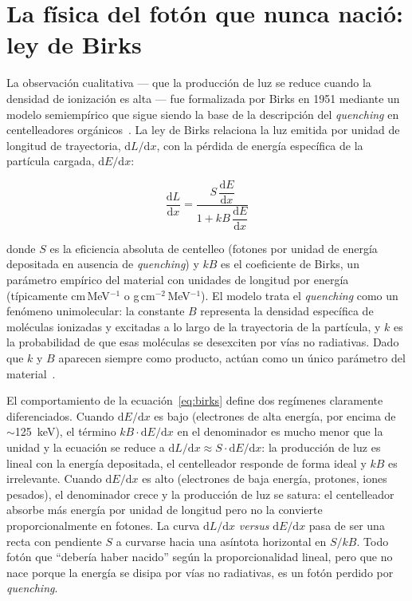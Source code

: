 \documentclass[11pt,a4paper]{article}
\begin{document}
\section{La física del fotón que nunca nació: ley de Birks}



La observación cualitativa --- que la producción de luz se reduce cuando la densidad de ionización es alta --- fue formalizada por Birks en 1951 mediante un modelo semiempírico que sigue siendo la base de la descripción del \textit{quenching} en centelleadores orgánicos~\cite{birks1951}. La ley de Birks relaciona la luz emitida por unidad de longitud de trayectoria, $\mathrm{d}L/\mathrm{d}x$, con la pérdida de energía específica de la partícula cargada, $\mathrm{d}E/\mathrm{d}x$:

\begin{equation}
\frac{\mathrm{d}L}{\mathrm{d}x} = \frac{S \,\dfrac{\mathrm{d}E}{\mathrm{d}x}}{1 + kB \,\dfrac{\mathrm{d}E}{\mathrm{d}x}}
\label{eq:birks}
\end{equation}

\noindent donde $S$ es la eficiencia absoluta de centelleo (fotones por unidad de energía depositada en ausencia de \textit{quenching}) y $kB$ es el coeficiente de Birks, un parámetro empírico del material con unidades de longitud por energía (típicamente cm\,MeV$^{-1}$ o g\,cm$^{-2}$\,MeV$^{-1}$). El modelo trata el \textit{quenching} como un fenómeno unimolecular: la constante $B$ representa la densidad específica de moléculas ionizadas y excitadas a lo largo de la trayectoria de la partícula, y $k$ es la probabilidad de que esas moléculas se desexciten por vías no radiativas. Dado que $k$ y $B$ aparecen siempre como producto, actúan como un único parámetro del material~\cite{boivin2016}.

El comportamiento de la ecuación~\eqref{eq:birks} define dos regímenes claramente diferenciados. Cuando $\mathrm{d}E/\mathrm{d}x$ es bajo (electrones de alta energía, por encima de $\sim$125~keV), el término $kB \cdot \mathrm{d}E/\mathrm{d}x$ en el denominador es mucho menor que la unidad y la ecuación se reduce a $\mathrm{d}L/\mathrm{d}x \approx S \cdot \mathrm{d}E/\mathrm{d}x$: la producción de luz es lineal con la energía depositada, el centelleador responde de forma ideal y $kB$ es irrelevante. Cuando $\mathrm{d}E/\mathrm{d}x$ es alto (electrones de baja energía, protones, iones pesados), el denominador crece y la producción de luz se satura: el centelleador absorbe más energía por unidad de longitud pero no la convierte proporcionalmente en fotones. La curva $\mathrm{d}L/\mathrm{d}x$ \textit{versus} $\mathrm{d}E/\mathrm{d}x$ pasa de ser una recta con pendiente $S$ a curvarse hacia una asíntota horizontal en $S/kB$. Todo fotón que ``debería haber nacido'' según la proporcionalidad lineal, pero que no nace porque la energía se disipa por vías no radiativas, es un fotón perdido por \textit{quenching}.
\end{document}
